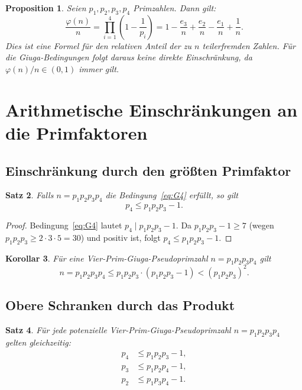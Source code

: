 \documentclass[12pt,a4paper]{amsart}
\newtheorem{theorem}{Satz}[section]
\newtheorem{corollary}[theorem]{Korollar}
\newtheorem{proposition}[theorem]{Proposition}
\theoremstyle{definition}
\begin{document}
\begin{proposition}
\label{prop:reziprok}
Seien $p_1, p_2, p_3, p_4$ Primzahlen.  Dann gilt:
\[
  \frac{\varphi(n)}{n} = \prod_{i=1}^4 \left(1 - \frac{1}{p_i}\right)
  = 1 - \frac{e_3}{n} + \frac{e_2}{n} - \frac{e_1}{n} + \frac{1}{n}.
\]
Dies ist eine Formel für den relativen Anteil der zu $n$ teilerfremden
Zahlen.  Für die Giuga-Bedingungen folgt daraus keine direkte Einschränkung,
da $\varphi(n)/n \in (0,1)$ immer gilt.
\end{proposition}

\section{Arithmetische Einschränkungen an die Primfaktoren}
\label{sec:schranken}

\subsection{Einschränkung durch den größten Primfaktor}

\begin{theorem}
\label{satz:p4schranke}
Falls $n = p_1 p_2 p_3 p_4$ die Bedingung~\eqref{eq:G4} erfüllt, so gilt
\[
  p_4 \le p_1 p_2 p_3 - 1.
\]
\end{theorem}

\begin{proof}
Bedingung~\eqref{eq:G4} lautet $p_4 \mid p_1 p_2 p_3 - 1$.  Da
$p_1 p_2 p_3 - 1 \ge 7$ (wegen $p_1 p_2 p_3 \ge 2 \cdot 3 \cdot 5 = 30$)
und positiv ist, folgt $p_4 \le p_1 p_2 p_3 - 1$.
\end{proof}

\begin{corollary}
\label{kor:groesse}
Für eine Vier-Prim-Giuga-Pseudoprimzahl $n = p_1 p_2 p_3 p_4$ gilt
\[
  n = p_1 p_2 p_3 p_4 \le p_1 p_2 p_3 \cdot (p_1 p_2 p_3 - 1)
  < (p_1 p_2 p_3)^2.
\]
\end{corollary}

\subsection{Obere Schranken durch das Produkt}

\begin{theorem}
\label{satz:obere-schranken}
Für jede potenzielle Vier-Prim-Giuga-Pseudoprimzahl $n = p_1 p_2 p_3 p_4$ gelten
gleichzeitig:
\begin{align*}
  p_4 &\le p_1 p_2 p_3 - 1, \\
  p_3 &\le p_1 p_2 p_4 - 1, \\
  p_2 &\le p_1 p_3 p_4 - 1.
\end{align*}
\end{theorem}
\end{document}
